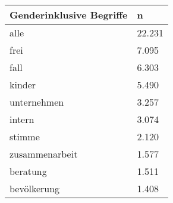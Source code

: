 
\begin{tabular}{ll}
\toprule
Genderinklusive Begriffe & n\\
\midrule
alle & 22.231\\
frei & 7.095\\
fall & 6.303\\
kinder & 5.490\\
unternehmen & 3.257\\
intern & 3.074\\
stimme & 2.120\\
zusammenarbeit & 1.577\\
beratung & 1.511\\
bevölkerung & 1.408\\
\bottomrule
\end{tabular}